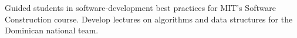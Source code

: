 \ifdefined\showSoftwareConstructionTA
{}
{Guided students in software-development best practices for MIT's Software Construction course.}
{}
\fi
\ifdefined\showDominicanOlympiadTrainer
{}
{Develop lectures on algorithms and data structures for the Dominican national team.}{}
\fi
\resumeSubHeadingListEnd
\vspace{-3.5mm}
